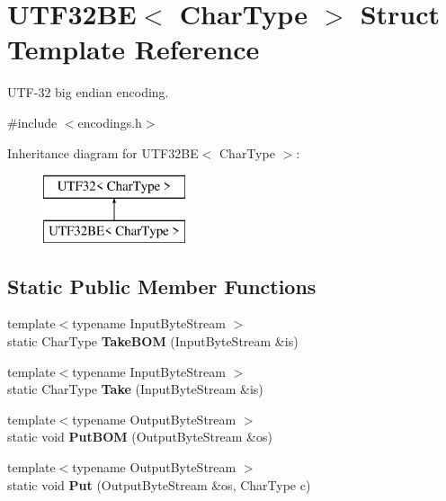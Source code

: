 \hypertarget{a00331}{}\section{U\+T\+F32\+BE$<$ Char\+Type $>$ Struct Template Reference}
\label{a00331}


U\+T\+F-\/32 big endian encoding.  




{\ttfamily \#include $<$encodings.\+h$>$}

Inheritance diagram for U\+T\+F32\+BE$<$ Char\+Type $>$\+:\begin{figure}[H]
\begin{center}
\leavevmode
\includegraphics[height=2.000000cm]{a00331}
\end{center}
\end{figure}
\subsection*{Static Public Member Functions}
\begin{DoxyCompactItemize}
\item 
{\footnotesize template$<$typename Input\+Byte\+Stream $>$ }\\static Char\+Type {\bfseries Take\+B\+OM} (Input\+Byte\+Stream \&is)\hypertarget{a00331_a07d228f51ad43ef83af2529ca4bd1181}{}\label{a00331_a07d228f51ad43ef83af2529ca4bd1181}

\item 
{\footnotesize template$<$typename Input\+Byte\+Stream $>$ }\\static Char\+Type {\bfseries Take} (Input\+Byte\+Stream \&is)\hypertarget{a00331_ace3086ece3b13417c758b5abcf3016c8}{}\label{a00331_ace3086ece3b13417c758b5abcf3016c8}

\item 
{\footnotesize template$<$typename Output\+Byte\+Stream $>$ }\\static void {\bfseries Put\+B\+OM} (Output\+Byte\+Stream \&os)\hypertarget{a00331_a8b1a216dd267ff06a9000cbe593ebd24}{}\label{a00331_a8b1a216dd267ff06a9000cbe593ebd24}

\item 
{\footnotesize template$<$typename Output\+Byte\+Stream $>$ }\\static void {\bfseries Put} (Output\+Byte\+Stream \&os, Char\+Type c)\hypertarget{a00331_ad270b8b016d477f7f7354df535fa28c5}{}\label{a00331_ad270b8b016d477f7f7354df535fa28c5}

\end{DoxyCompactItemize}
